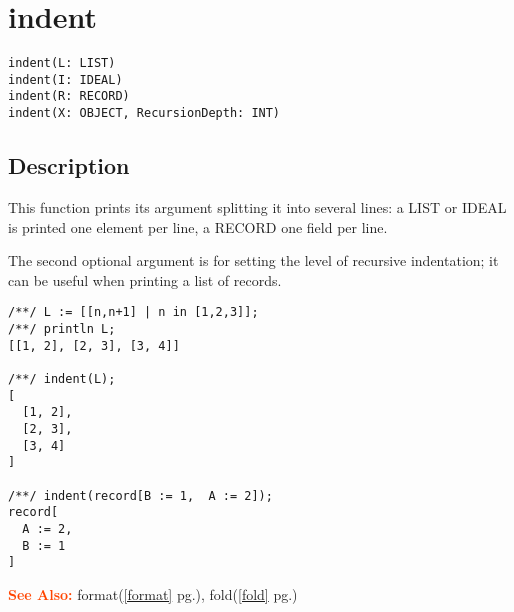 \documentclass[a4paper]{mybook}
\newenvironment{command}{}{} %
\newcommand\SeeAlso{\par\textcolor{OrangeRed}{\textbf{\large See Also: }}}
\begin{document}
\section{indent}
\label{indent}
\begin{command} %


\begin{Verbatim}[label=syntax, rulecolor=\color{MidnightBlue},
frame=single]
indent(L: LIST)
indent(I: IDEAL)
indent(R: RECORD)
indent(X: OBJECT, RecursionDepth: INT)
\end{Verbatim}


\subsection*{Description}

This function prints its argument splitting it into several lines:
a LIST or IDEAL is printed one element per line, a RECORD
one field per line.
\par 
The second optional argument is for setting the level of recursive
indentation; it can be useful when printing a list of records.
\begin{Verbatim}[label=example, rulecolor=\color{PineGreen}, frame=single]
/**/ L := [[n,n+1] | n in [1,2,3]];
/**/ println L;
[[1, 2], [2, 3], [3, 4]]

/**/ indent(L);
[
  [1, 2],
  [2, 3],
  [3, 4]
]

/**/ indent(record[B := 1,  A := 2]);
record[
  A := 2,
  B := 1
]
\end{Verbatim}


\SeeAlso %
  format(\ref{format} pg.\pageref{format}), 
    fold(\ref{fold} pg.\pageref{fold})
\end{command} %
\end{document}

